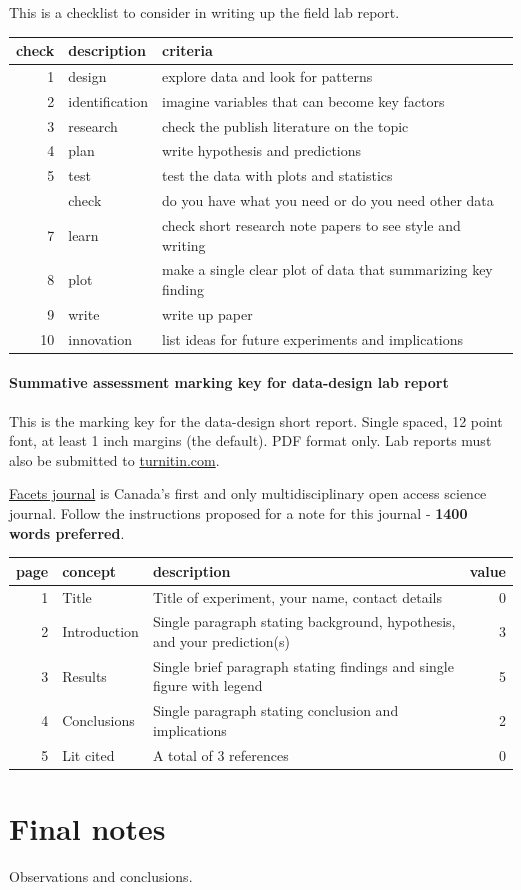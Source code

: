 \documentclass[
]{book}
\begin{document}
This is a checklist to consider in writing up the field lab report.

\begin{tabular}{rll}
\toprule
check & description & criteria\\
\midrule
1 & design & explore data and look for patterns\\
2 & identification & imagine variables that can become key factors\\
3 & research & check the publish literature on the topic\\
4 & plan & write hypothesis and predictions\\
5 & test & test the data with plots and statistics\\
\addlinespace
6 & check & do you have what you need or do you need other data\\
7 & learn & check short research note papers to see style and writing\\
8 & plot & make a single clear plot of data that summarizing key finding\\
9 & write & write up paper\\
10 & innovation & list ideas for future experiments and implications\\
\bottomrule
\end{tabular}

\hypertarget{summative-assessment-marking-key-for-data-design-lab-report}{%
\subsubsection*{Summative assessment marking key for data-design lab report}\label{summative-assessment-marking-key-for-data-design-lab-report}}

This is the marking key for the data-design short report. Single spaced, 12 point font, at least 1 inch margins (the default). PDF format only. Lab reports must also be submitted to \href{https://www.turnitin.com}{turnitin.com}.

\href{https://www.facetsjournal.com/authors/instructions/}{Facets journal} is Canada's first and only multidisciplinary open access science journal. Follow the instructions proposed for a note for this journal - \textbf{1400 words preferred}.

\begin{tabular}{rllr}
\toprule
page & concept & description & value\\
\midrule
1 & Title & Title of experiment, your name, contact details & 0\\
2 & Introduction & Single paragraph stating background, hypothesis, and your prediction(s) & 3\\
3 & Results & Single brief paragraph stating findings and single figure with legend & 5\\
4 & Conclusions & Single paragraph stating conclusion and implications & 2\\
5 & Lit cited & A total of 3 references & 0\\
\bottomrule
\end{tabular}

\hypertarget{notes}{%
\chapter{Final notes}\label{notes}}

Observations and conclusions.

  
\end{document}

